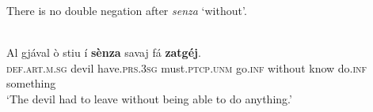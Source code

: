 There is no double negation after \textit{senza} ‘without’.

\ea\label{}
 {\citealt[147]{Büchli1966}}\\
\gll    Al gjával ò stiu í \textbf{sènza} savaj fá \textbf{zatgéj}.\\
      \textsc{def.art.m.sg} devil have.\textsc{prs.3sg} must.\textsc{ptcp.unm} go.\textsc{inf} without know do.\textsc{inf} something \\
\glt `The devil had to leave without being able to do anything.'
\z







